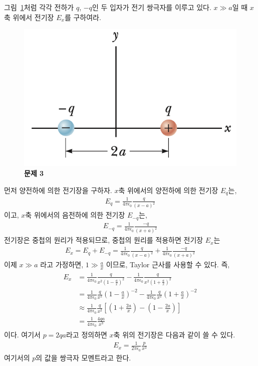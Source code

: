 \documentclass[tightenlines,floatfix,nofootinbib,superscriptaddress,fleqn]{revtex4-2}
\begin{document}
 그림~\ref{fig:1}처럼 각각 전하가 $q$,
$-q$인 두 입자가 전기 쌍극자를 이루고 있다. $x\gg a$일 때 $x$ 축
위에서 전기장 $E_x$를 구하여라. 
\begin{figure}[htp]
  \centering
  \includegraphics[scale=0.6]{qfig2-1.png}
  \caption{\textbf{문제 3}}
  \label{fig:1}
\end{figure}

\vspace{1.cm}
먼저 양전하에 의한 전기장을 구하자. $x$축 위에서의 양전하에 의한 전기장 $E_q$는,
\begin{align}
  E_q=\frac{1}{4\pi\epsilon_0}\frac{q}{\left(x-a\right)^2}
\end{align}
이고, $x$축 위에서의 음전하에 의한 전기장 $E_{-q}$는,
\begin{align}
  E_{-q}=\frac{1}{4\pi\epsilon_0}\frac{-q}{\left(x+a\right)^2}
\end{align}
전기장은 중첩의 원리가 적용되므로, 중첩의 원리를 적용하면 전기장 $E_x$는
\begin{align}
  E_x=E_q+E_{-q}=\frac{1}{4\pi\epsilon_0}\frac{q}{\left(x-a\right)^2}+\frac{1}{4\pi\epsilon_0}\frac{-q}{\left(x+a\right)^2}
\end{align}
이제 $x\gg a$ 라고 가정하면, $1\gg\frac{a}{x}$ 이므로, Taylor 근사를 사용할 수 있다. 즉,
\begin{align}
  \begin{split}
    E_x&=\frac{1}{4\pi\epsilon_0}\frac{q}{x^2\left(1-\frac{a}{x}\right)^2}-\frac{1}{4\pi\epsilon_0}\frac{q}{x^2\left(1+\frac{a}{x}\right)^2}\\
    &=\frac{1}{4\pi\epsilon_0}\frac{q}{x^2}\left(1-\frac{a}{x}\right)^{-2}-\frac{1}{4\pi\epsilon_0}\frac{q}{x^2}\left(1+\frac{a}{x}\right)^{-2}\\
    &\approx\frac{1}{4\pi\epsilon_0}\frac{q}{x^2}\left[\left(1+\frac{2a}{x}\right)-\left(1-\frac{2a}{x}\right)\right]\\
    &=\frac{1}{4\pi\epsilon_0}\frac{4qa}{x^3}
  \end{split}
\end{align}
이다. 여기서 $p=2qa$라고 정의하면 $x$축 위의 전기장은 다음과 같이 쓸 수 있다.
\begin{align}
  E_x=\frac{1}{2\pi\epsilon_0}\frac{p}{x^3}
\end{align}
여기서의 $p$의 값을 쌍극자 모멘트라고 한다.
\vspace{1.cm}
\end{document}
